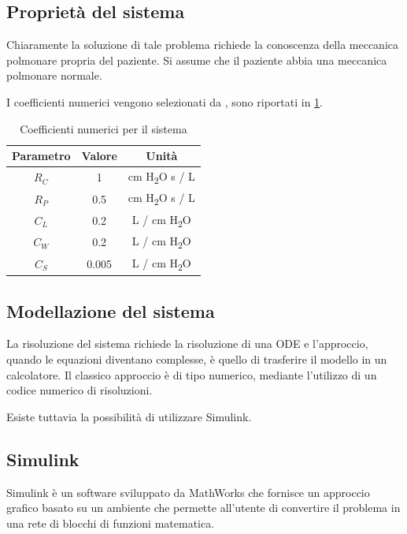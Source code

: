 \subsection{Proprietà del sistema}


Chiaramente la soluzione di tale problema richiede la conoscenza della meccanica polmonare propria del paziente. Si assume che il paziente abbia una meccanica polmonare normale.

I coefficienti numerici vengono selezionati da \citeauthor{khoo_physiological_2018} \cite{khoo_physiological_2018}, sono riportati in \cref{tab:coefficienti}.


\begin{table}[h!]
	\centering
	\begin{tabular}{|c|c|c|}
		\hline
		Parametro & Valore & Unità \\ \hline
		$R_C$ & 1 & cm H\textsubscript{2}O s / L \\ \hline
		$R_P$ & 0.5 & cm H\textsubscript{2}O s / L \\ \hline
		$C_L$ & 0.2 & L / cm  H\textsubscript{2}O \\ \hline
		$C_W$ & 0.2 & L / cm  H\textsubscript{2}O \\ \hline
		$C_S$ & 0.005 & L / cm  H\textsubscript{2}O \\ \hline
	\end{tabular}
\caption{Coefficienti numerici per il sistema \cite{khoo_physiological_2018}}
\label{tab:coefficienti}
\end{table}

\subsection{Modellazione del sistema}

La risoluzione del sistema richiede la risoluzione di una ODE e l'approccio, quando le equazioni diventano complesse, è quello di trasferire il modello in un calcolatore. Il classico approccio è di tipo numerico, mediante l'utilizzo di un codice numerico di risoluzioni.

Esiste tuttavia la possibilità di utilizzare Simulink. 

\subsection{Simulink}


Simulink \cite{simulink} è un software sviluppato da MathWorks che fornisce un approccio grafico basato su un ambiente che permette all'utente di convertire il problema in una rete di blocchi di funzioni matematica. 

